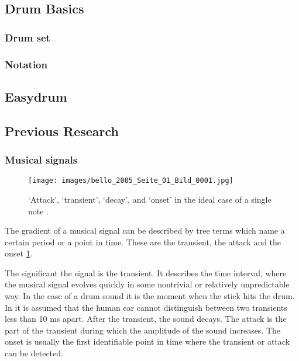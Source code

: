 \subsection{Drum Basics}

\subsubsection{Drum set}

\subsubsection{Notation}

\subsection{Easydrum}

\subsection{Previous Research}

\subsubsection{Musical signals}

\begin{figure}[h]
	\centering
	\texttt{[image: images/bello\_2005\_Seite\_01\_Bild\_0001.jpg]}
	\label{}
	\caption{`Attack', `transient', `decay', and `onset' in the ideal case of a single note \autocite[Fig. 1]{Bello:2005}.}
	\label{fig:MusicalSignal}
\end{figure}

The gradient of a musical signal can be described by tree terms which name a certain period or a point in time. These are the transient, the attack and the onset \ref{fig:MusicalSignal}.

The significant the signal is the transient. It describes the time interval, where the musical signal evolves quickly in some nontrivial or relatively unpredictable way. In the case of a drum sound it is the moment when the stick hits the drum. In \autocite[]{Bello:2005} it is assumed that the human ear cannot distinguish between two transients less than 10 ms apart. After the transient, the sound decays. The attack is the part of the transient during which the amplitude of the sound increases. The onset is usually the first identifiable point in time where the transient or attack can be detected.

